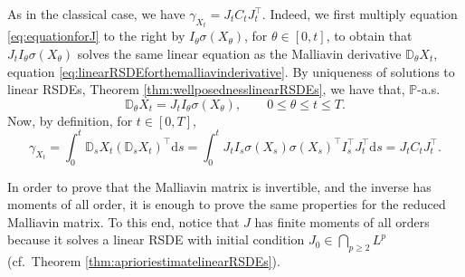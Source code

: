 \documentclass[11pt,a4paper]{article}
\newcommand{\rd}{\mathrm{d}}
\theoremstyle{plain}
\begin{document}
As in the classical case, we have $\gamma_{X_t} = J_tC_tJ_t^{\top}$. Indeed, we first multiply equation \eqref{eq:equationforJ} to the right by $I_{\theta}\sigma(X_{\theta})$, for $\theta \in [0,t]$, to obtain that $J_tI_{\theta}\sigma(X_{\theta})$ solves the same linear equation as the Malliavin derivative $\mathbb{D}_{\theta}X_t$, equation \eqref{eq:linearRSDEforthemalliavinderivative}. By uniqueness of solutions to linear RSDEs, Theorem \ref{thm:wellposednesslinearRSDEs}, we have that, $\mathbb{P}$-a.s.
\begin{equation*}
    \mathbb{D}_{\theta}X_t = J_t I_{\theta}\sigma(X_{\theta}),
    \qquad 0\leq \theta \leq t \leq T.
\end{equation*}
Now, by definition, for $t\in [0,T]$,
\begin{equation*}
    \gamma_{X_t} = \int_0^t \mathbb{D}_{s}X_t(\mathbb{D}_{s}X_t)^{\top} \rd s
    = \int_0^t J_t I_{s}\sigma(X_s) \sigma(X_s)^{\top}I_{s}^{\top} J_t^{\top}\rd s
    = J_t C_t J_t^{\top}.
\end{equation*}

In order to prove that the Malliavin matrix is invertible, and the inverse has moments of all order, it is enough to prove the same properties for the reduced Malliavin matrix.
{To this end, notice that $J$ has finite moments of all orders because it solves a linear RSDE with initial condition $J_0 \in \bigcap_{p \ge 2} L^p$ (cf.\ Theorem \ref{thm:aprioriestimatelinearRSDEs}). }

\end{document}
